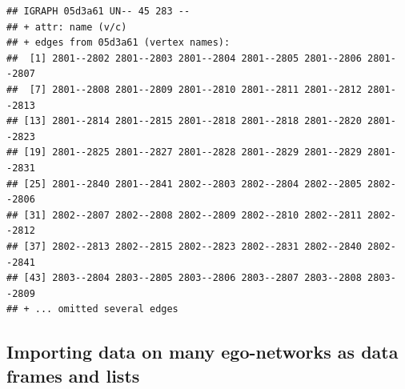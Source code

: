 \documentclass[
]{book}
\begin{document}
\begin{verbatim}
## IGRAPH 05d3a61 UN-- 45 283 -- 
## + attr: name (v/c)
## + edges from 05d3a61 (vertex names):
##  [1] 2801--2802 2801--2803 2801--2804 2801--2805 2801--2806 2801--2807
##  [7] 2801--2808 2801--2809 2801--2810 2801--2811 2801--2812 2801--2813
## [13] 2801--2814 2801--2815 2801--2818 2801--2818 2801--2820 2801--2823
## [19] 2801--2825 2801--2827 2801--2828 2801--2829 2801--2829 2801--2831
## [25] 2801--2840 2801--2841 2802--2803 2802--2804 2802--2805 2802--2806
## [31] 2802--2807 2802--2808 2802--2809 2802--2810 2802--2811 2802--2812
## [37] 2802--2813 2802--2815 2802--2823 2802--2831 2802--2840 2802--2841
## [43] 2803--2804 2803--2805 2803--2806 2803--2807 2803--2808 2803--2809
## + ... omitted several edges
\end{verbatim}

\hypertarget{importing-data-on-many-ego-networks-as-data-frames-and-lists}{%
\subsection{Importing data on many ego-networks as data frames and lists}\label{importing-data-on-many-ego-networks-as-data-frames-and-lists}}
\end{document}
